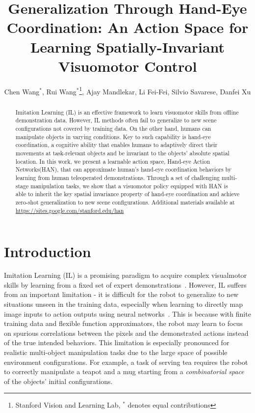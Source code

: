 \documentclass[letterpaper, 10 pt, conference]{ieeeconf}
\title{\LARGE \bf
Generalization Through Hand-Eye Coordination: An Action Space for Learning Spatially-Invariant Visuomotor Control
}
\author{
    Chen Wang$^{*}$, Rui Wang$^{*}$\thanks{Stanford Vision and Learning Lab, $^*$ denotes equal contributions}, Ajay Mandlekar, Li Fei-Fei, Silvio Savarese, Danfei Xu
}
\newcommand{\algoName}{HAN\xspace}
\newcommand{\algoNameFull}{Hand-eye Action Networks\xspace}
\begin{document}
\maketitle
\thispagestyle{empty}
\pagestyle{empty}
\vspace{-20mm}

\begin{abstract}
Imitation Learning (IL) is an effective framework to learn visuomotor skills from offline demonstration data. However, IL methods often fail to generalize to new scene configurations not covered by training data. On the other hand, humans can manipulate objects in varying conditions. Key to such capability is hand-eye coordination, a cognitive ability that enables humans to adaptively direct their movements at task-relevant objects and be invariant to the objects’ absolute spatial location. In this work, we present a learnable action space, \algoNameFull (\algoName), that can approximate human’s hand-eye coordination behaviors by learning from human teleoperated demonstrations. Through a set of challenging multi-stage manipulation tasks, we show that a visuomotor policy equipped with \algoName is able to inherit the key spatial invariance property of hand-eye coordination and achieve zero-shot generalization to new scene configurations. Additional materials available at \url{https://sites.google.com/stanford.edu/han}

\end{abstract}

\section{Introduction}
Imitation Learning (IL) is a promising paradigm to acquire complex visualmotor skills by learning from a fixed set of expert demonstrations~\cite{Ijspeert2002MovementIW, Schaal1999IsIL, Billard2008RobotPB, Calinon2010LearningAR, englert2018learning,zhang2018deep}. However, IL
suffers from an important limitation - it is difficult for the
robot to generalize to new situations unseen in the training data, especially when learning to directly map image inputs to action outputs using neural networks~\cite{zhang2018deep}. This is because with finite training data and flexible function approximators, the robot may learn to focus on spurious correlations between the pixels and the demonstrated actions instead of the true intended behaviors. This limitation is especially pronounced for realistic multi-object manipulation tasks due to the large space of possible environment configurations. For example, a task of serving tea requires the robot to correctly manipulate a teapot and a mug starting from a \emph{combinatorial space} of the objects' initial configurations.  
\end{document}
